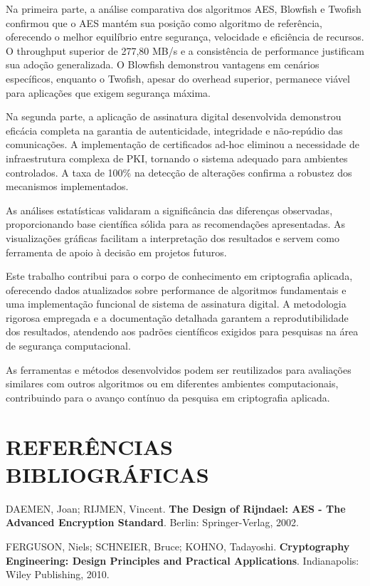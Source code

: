 \documentclass[12pt,a4paper,oneside]{article}
\begin{document}
Na primeira parte, a análise comparativa dos algoritmos AES, Blowfish e Twofish confirmou que o AES mantém sua posição como algoritmo de referência, oferecendo o melhor equilíbrio entre segurança, velocidade e eficiência de recursos. O throughput superior de 277,80 MB/s e a consistência de performance justificam sua adoção generalizada. O Blowfish demonstrou vantagens em cenários específicos, enquanto o Twofish, apesar do overhead superior, permanece viável para aplicações que exigem segurança máxima.

Na segunda parte, a aplicação de assinatura digital desenvolvida demonstrou eficácia completa na garantia de autenticidade, integridade e não-repúdio das comunicações. A implementação de certificados ad-hoc eliminou a necessidade de infraestrutura complexa de PKI, tornando o sistema adequado para ambientes controlados. A taxa de 100\% na detecção de alterações confirma a robustez dos mecanismos implementados.

As análises estatísticas validaram a significância das diferenças observadas, proporcionando base científica sólida para as recomendações apresentadas. As visualizações gráficas facilitam a interpretação dos resultados e servem como ferramenta de apoio à decisão em projetos futuros.

Este trabalho contribui para o corpo de conhecimento em criptografia aplicada, oferecendo dados atualizados sobre performance de algoritmos fundamentais e uma implementação funcional de sistema de assinatura digital. A metodologia rigorosa empregada e a documentação detalhada garantem a reprodutibilidade dos resultados, atendendo aos padrões científicos exigidos para pesquisas na área de segurança computacional.

As ferramentas e métodos desenvolvidos podem ser reutilizados para avaliações similares com outros algoritmos ou em diferentes ambientes computacionais, contribuindo para o avanço contínuo da pesquisa em criptografia aplicada.

\section{REFERÊNCIAS BIBLIOGRÁFICAS}

DAEMEN, Joan; RIJMEN, Vincent. \textbf{The Design of Rijndael: AES - The Advanced Encryption Standard}. Berlin: Springer-Verlag, 2002.

FERGUSON, Niels; SCHNEIER, Bruce; KOHNO, Tadayoshi. \textbf{Cryptography Engineering: Design Principles and Practical Applications}. Indianapolis: Wiley Publishing, 2010.
\end{document}
